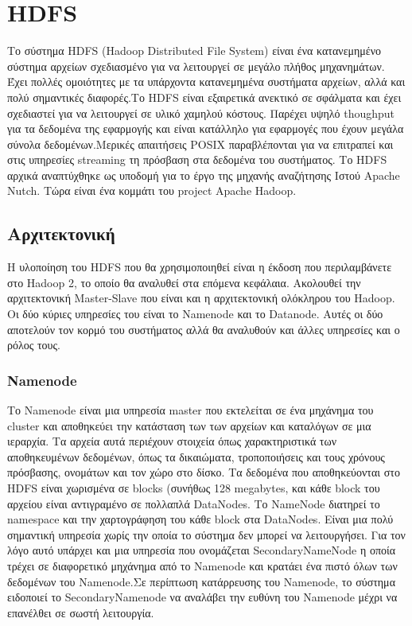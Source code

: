 \chapter{HDFS}
Το σύστημα HDFS (Hadoop Distributed File System) είναι ένα κατανεμημένο σύστημα αρχείων σχεδιασμένο για να λειτουργεί σε μεγάλο πλήθος μηχανημάτων. Έχει πολλές ομοιότητες με τα υπάρχοντα κατανεμημένα συστήματα αρχείων, αλλά και πολύ σημαντικές διαφορές.Το HDFS είναι εξαιρετικά ανεκτικό σε σφάλματα και έχει σχεδιαστεί για να λειτουργεί σε υλικό χαμηλού κόστους. Παρέχει υψηλό thoughput για τα δεδομένα της εφαρμογής και είναι κατάλληλο για εφαρμογές που έχουν μεγάλα σύνολα δεδομένων.Μερικές απαιτήσεις POSIX παραβλέπονται για να επιτραπεί και στις υπηρεσίες streaming τη πρόσβαση στα δεδομένα του συστήματος. Το HDFS αρχικά αναπτύχθηκε ως υποδομή για το έργο της μηχανής αναζήτησης Ιστού Apache Nutch. Τώρα είναι ένα κομμάτι του project Apache Hadoop.


\section{Αρχιτεκτονική}
H υλοποίηση του HDFS που θα χρησιμοποιηθεί είναι η έκδοση που περιλαμβάνετε στο Hadoop 2, το οποίο θα αναλυθεί στα επόμενα κεφάλαια. Ακολουθεί την αρχιτεκτονική Master-Slave που είναι και η αρχιτεκτονική ολόκληρου του Hadoop. Οι δύο κύριες υπηρεσίες του είναι το Namenode και το Datanode. Αυτές οι δύο αποτελούν τον κορμό του  συστήματος αλλά θα αναλυθούν και άλλες υπηρεσίες και ο ρόλος τους.

\subsection{Namenode}
Το Namenode είναι μια υπηρεσία master που εκτελείται σε ένα μηχάνημα του cluster και αποθηκεύει την κατάσταση των των αρχείων και καταλόγων σε μια ιεραρχία. Τα αρχεία αυτά περιέχουν στοιχεία όπως χαρακτηριστικά των αποθηκευμένων δεδομένων, όπως τα δικαιώματα, τροποποιήσεις και τους χρόνους πρόσβασης, ονομάτων και τον χώρο στο δίσκο. Τα δεδομένα που αποθηκεύονται στο HDFS είναι χωρισμένα σε blocks (συνήθως 128 megabytes, και κάθε block του αρχείου είναι αντιγραμένο σε πολλαπλά DataNodes. Το NameNode διατηρεί το namespace και την χαρτογράφηση του κάθε block στα DataNodes. Είναι μια πολύ σημαντική υπηρεσία χωρίς την οποία το σύστημα δεν μπορεί να λειτουργήσει. Για τον λόγο αυτό υπάρχει και μια υπηρεσία που ονομάζεται SecondaryNameNode η οποία τρέχει σε διαφορετικό μηχάνημα από το Namenode και κρατάει ένα πιστό όλων των δεδομένων του Namenode.Σε περίπτωση κατάρρευσης του Namenode, το σύστημα ειδοποιεί το SecondaryNamenode να αναλάβει την ευθύνη του Namenode μέχρι να επανέλθει σε σωστή λειτουργία.

